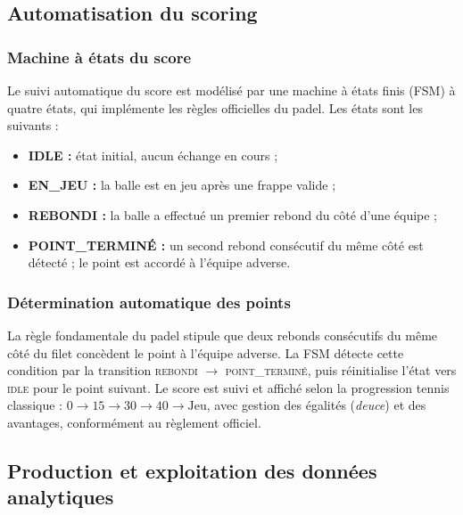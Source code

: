 \subsection{Automatisation du scoring}

\subsubsection{Machine à états du score}

Le suivi automatique du score est modélisé par une machine à états finis (FSM) à quatre
états, qui implémente les règles officielles du padel. Les états sont les suivants :

\begin{itemize}[leftmargin=1.5em]
  \item \textbf{IDLE :} état initial, aucun échange en cours ;
  \item \textbf{EN\_JEU :} la balle est en jeu après une frappe valide ;
  \item \textbf{REBONDI :} la balle a effectué un premier rebond du côté d'une équipe ;
  \item \textbf{POINT\_TERMINÉ :} un second rebond consécutif du même côté est détecté ;
        le point est accordé à l'équipe adverse.
\end{itemize}

\subsubsection{Détermination automatique des points}

La règle fondamentale du padel stipule que deux rebonds consécutifs du même côté du filet
concèdent le point à l'équipe adverse. La FSM détecte cette condition par la transition
\textsc{rebondi} $\to$ \textsc{point\_terminé}, puis réinitialise l'état vers \textsc{idle}
pour le point suivant. Le score est suivi et affiché selon la progression tennis classique :
$0 \to 15 \to 30 \to 40 \to \text{Jeu}$, avec gestion des égalités (\textit{deuce}) et des
avantages, conformément au règlement officiel.

\subsection{Production et exploitation des données analytiques}

